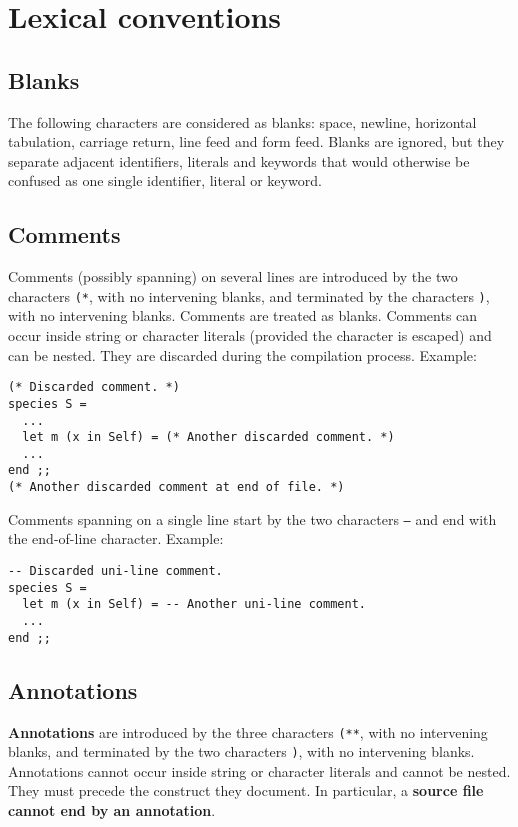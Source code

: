 
\section{Lexical conventions}

\subsection{Blanks}
The following characters are considered as blanks: space, newline,
horizontal tabulation, carriage return, line feed and form
feed. Blanks are ignored, but they separate adjacent identifiers,
literals and keywords that would otherwise be confused as one single
identifier, literal or keyword.

\subsection{Comments}
Comments (possibly spanning) on several lines are introduced by the
two characters {\tt (*}, with no intervening blanks, and terminated by
the characters {\tt *)}, with no intervening blanks. Comments are
treated as blanks. Comments can occur inside string or character
literals (provided the {\tt *} character is escaped) and can be nested. They
are discarded during the compilation process. Example:
{\scriptsize
\begin{lstlisting}
(* Discarded comment. *)
species S =
  ...
  let m (x in Self) = (* Another discarded comment. *)
  ...
end ;;
(* Another discarded comment at end of file. *)
\end{lstlisting}
}

Comments spanning on a single line start by the two characters
{\tt --} and end with the end-of-line character.
Example:
{\scriptsize
\begin{lstlisting}
-- Discarded uni-line comment.
species S =
  let m (x in Self) = -- Another uni-line comment.
  ...
end ;;
\end{lstlisting}
}

\subsection{Annotations}
\label{annotation}
{\bf Annotations} are introduced by the three characters {\tt (**},
with no intervening blanks, and terminated by the two characters
{\tt *)}, with no intervening blanks.
Annotations cannot occur inside string or character literals and
cannot be nested. They must precede the construct they document.
In particular, a {\bf source file cannot end by an annotation}.

